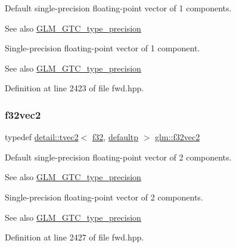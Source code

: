 Default single-\/precision floating-\/point vector of 1 components. \begin{DoxySeeAlso}{See also}
\hyperlink{group__gtc__type__precision}{G\+L\+M\+\_\+\+G\+T\+C\+\_\+type\+\_\+precision}
\end{DoxySeeAlso}
Single-\/precision floating-\/point vector of 1 component. \begin{DoxySeeAlso}{See also}
\hyperlink{group__gtc__type__precision}{G\+L\+M\+\_\+\+G\+T\+C\+\_\+type\+\_\+precision} 
\end{DoxySeeAlso}


Definition at line 2423 of file fwd.\+hpp.

\mbox{\label{group__gtc__type__precision_ga0eba48c6b8abbee31dbf5655dd171ead}} 
\subsubsection{\texorpdfstring{f32vec2}{f32vec2}}
{\footnotesize\ttfamily typedef \hyperlink{structglm_1_1detail_1_1tvec2}{detail\+::tvec2}$<$ \hyperlink{group__gtc__type__precision_ga0ec999b57f5330d9021256e96038df04}{f32}, \hyperlink{namespaceglm_a0f04f086094c747d227af4425893f545a9d21ccd8b5a009ec7eb7677befc3bf51}{defaultp} $>$ \hyperlink{group__gtc__type__precision_ga0eba48c6b8abbee31dbf5655dd171ead}{glm\+::f32vec2}}

Default single-\/precision floating-\/point vector of 2 components. \begin{DoxySeeAlso}{See also}
\hyperlink{group__gtc__type__precision}{G\+L\+M\+\_\+\+G\+T\+C\+\_\+type\+\_\+precision}
\end{DoxySeeAlso}
Single-\/precision floating-\/point vector of 2 components. \begin{DoxySeeAlso}{See also}
\hyperlink{group__gtc__type__precision}{G\+L\+M\+\_\+\+G\+T\+C\+\_\+type\+\_\+precision} 
\end{DoxySeeAlso}


Definition at line 2427 of file fwd.\+hpp.

\mbox{\label{group__gtc__type__precision_ga9b74939fb3bdd450be65f798037dd79d}} 
